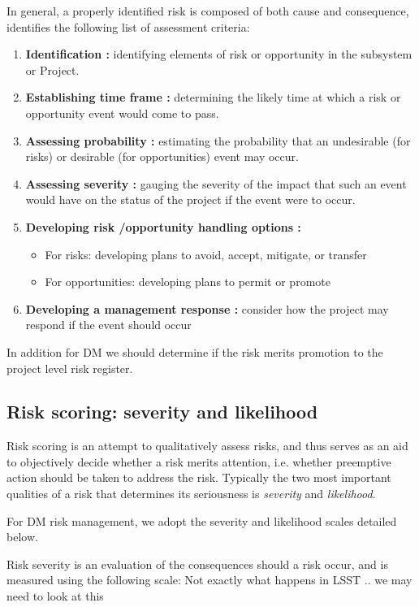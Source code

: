 In general, a properly identified risk is composed of both cause and consequence,  identifies the following list of assessment criteria:
\begin{enumerate}
\item {\bf Identification : } 
identifying elements of risk or opportunity in the subsystem or Project.
\item {\bf Establishing  time  frame :}
    determining  the  likely  time at  which a  risk or  opportunity event would come to pass.
\item {\bf Assessing  probability :  }
  estimating  the  probability  that  an  undesirable (for  risks)  or desirable (for opportunities) event may occur.
\item {\bf Assessing  severity :} 
   gauging  the  severity  of  the  impact  that  such  an  event  would  have on the status of the project if the event were to occur.  
\item {\bf Developing risk /opportunity handling options :}   
\begin{itemize}
\item  For  risks: developing  plans to  avoid, accept, mitigate, or transfer
\item  For opportunities: developing plans to permit or promote
\end{itemize}

\item {\bf Developing  a  management  response : }
 consider  how  the  project  may  respond  if  the event should occur
\end{enumerate}

In addition for DM we should determine if the risk merits promotion to the project level risk register. 

\subsection{Risk scoring: severity and likelihood \label{sect:scoring}}

Risk scoring is an attempt to qualitatively assess risks, and thus serves as an aid to objectively decide whether a risk merits attention, i.e. whether preemptive action should be taken to address the risk. Typically the two most important qualities of a risk that determines its seriousness is {\em severity} and {\em likelihood}.

For DM risk management, we adopt the severity and likelihood scales detailed below.

Risk severity is an evaluation of the consequences should a risk occur, and is measured using the following scale:
{\color{red} Not exactly what happens in LSST .. we may need to look at this}

